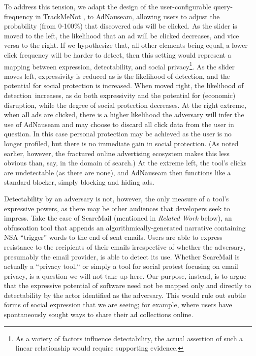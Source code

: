\documentclass[conference]{IEEEtran}
\begin{document}
To address this tension, we adapt the design of the user-configurable query-frequency in TrackMeNot \cite{Howe-1}, to AdNauseam, allowing users to adjust the probability (from 0-100\%) that discovered ads will be clicked. As the slider is moved to the left, the likelihood that an ad will be clicked decreases, and vice versa to the right. If we  hypothesize that, all other elements being equal, a lower click frequency will be harder to detect, then this setting would represent a mapping between expression, detectability, and social privacy\footnote{As a variety of factors influence detectability, the actual assertion of such a linear relationship would require supporting evidence.}. As the slider moves left, expressivity is reduced as is the likelihood of detection, and the potential for social protection is increased. When moved right, the likelihood of detection increases, as do both expressivity and the potential for (economic) disruption, while the degree of social protection decreases. At the right extreme, when all ads are clicked, there is a higher likelihood the adversary will infer the use of AdNauseam and may choose to discard all click data from the user in question. In this case personal protection may be achieved as the user is no longer profiled, but there is no immediate gain in social protection. (As noted earlier, however, the fractured online advertising ecosystem makes this less obvious than, say, in the domain of search.) At the extreme left, the tool's clicks are undetectable (as there are none), and AdNauseam then functions like a standard blocker, simply blocking and hiding ads.

Detectability by an adversary is not, however, the only measure of a tool’s expressive powers, as there may be other audiences that developers seek to impress. Take the case of ScareMail (mentioned in \emph{Related Work} below), an obfuscation tool that appends an algorithmically-generated narrative containing NSA “trigger” words to the end of sent emails. Users are able to express resistance to the recipients of their emails irrespective of whether the adversary, presumably the email provider, is able to detect its use. Whether ScareMail is actually a “privacy tool,“ or simply a tool for social protest focusing on email privacy, is a question we will not take up here. Our purpose, instead, is to argue that the expressive potential of software need not be mapped only and directly to detectability by the actor identified as the adversary. This would rule out subtle forms of social expression that we are seeing; for example, where users have spontaneously sought ways to share their ad collections online.
\end{document}
